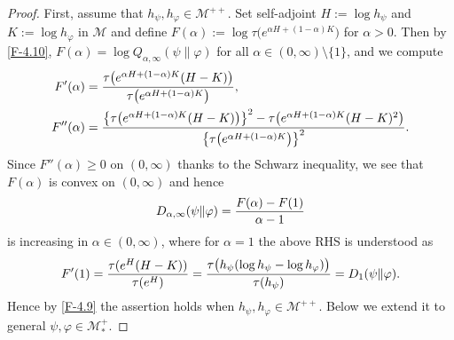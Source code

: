 \documentclass[12pt]{article}
\theoremstyle{definition}
\theoremstyle{remark}
\numberwithin{equation}{section}
\def\Me{\mathcal M}
\def\ffi{\varphi}
\begin{document}
\begin{proof}
First, assume that $h_\psi,h_\ffi\in\Me^{++}$. Set self-adjoint $H:=\log h_\psi$ and $K:=\log h_\ffi$ in $\Me$
and define $F(\alpha):=\log\tau\bigl(e^{\alpha H+(1-\alpha)K}\bigr)$ for $\alpha>0$.
Then by \eqref{F-4.10}, $F(\alpha)=\log Q_{\alpha,\infty}(\psi\|\ffi)$ for all $\alpha\in(0,\infty)\setminus\{1\}$,
and we compute
\begin{align*}
F'(\alpha)&={\tau\bigl(e^{\alpha H+(1-\alpha)K}(H-K)\bigr)\over\tau\bigl(e^{\alpha H+(1-\alpha)K}\bigr)}, \\
F''(\alpha)&={\bigl\{\tau\bigl(e^{\alpha H+(1-\alpha)K}(H-K)\bigr)\bigr\}^2
-\tau\bigl(e^{\alpha H+(1-\alpha)K}(H-K)^2\bigr)\over\bigl\{\tau\bigl(e^{\alpha H+(1-\alpha)K}\bigr)\bigr\}^2}.
\end{align*}
Since $F''(\alpha)\ge0$ on $(0,\infty)$ thanks to the Schwarz inequality, we see that $F(\alpha)$ is
convex on $(0,\infty)$ and hence
\[
D_{\alpha,\infty}(\psi\|\ffi)={F(\alpha)-F(1)\over\alpha-1}
\]
is increasing in $\alpha\in(0,\infty)$, where for $\alpha=1$ the above RHS is understood as
\[
F'(1)={\tau(e^H(H-K))\over\tau(e^H)}={\tau\bigl(h_\psi(\log h_\psi-\log h_\ffi)\bigr)\over\tau(h_\psi)}
=D_1(\psi\|\ffi).
\]
Hence by \eqref{F-4.9} the assertion holds when $h_\psi,h_\ffi\in\Me^{++}$. Below we extend it to general
$\psi,\ffi\in\Me_*^+$.


\end{proof}
\end{document}

